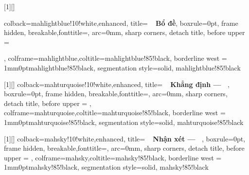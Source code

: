 [1][]{
            colback=mahlightblue!10!white,enhanced,
            title={\textbf{\faBook \ \ Bổ đề}},
            boxrule=0pt,
	    frame hidden,
            breakable,fonttitle=\sffamily,
            arc=0mm,
            sharp corners,
            detach title,
            before upper = \tcbtitle\par\smallskip,
            colframe=mahlightblue,coltitle=mahlightblue!85!black,
            borderline west = {1mm}{0pt}{mahlightblue!85!black},
            segmentation style={solid, mahlightblue!85!black}
}

[1][]{
            colback=mahturquoise!10!white,enhanced,
            title={\textbf{\faExclamation \ \ Khẳng định --- \ }},
            boxrule=0pt,
	    frame hidden,
            breakable,fonttitle=\sffamily,
            arc=0mm,
            sharp corners,
            detach title,
            before upper = \tcbtitle,
            colframe=mahturquoise,coltitle=mahturquoise!85!black,
            borderline west = {1mm}{0pt}{mahturquoise!85!black},
            segmentation style={solid, mahturquoise!85!black}
}

[1][]{
            colback=mahsky!10!white,enhanced,
            title={\textbf{\faExclamation \ \ Nhận xét --- \ }},
            boxrule=0pt,
	    frame hidden,
            breakable,fonttitle=\sffamily,
            arc=0mm,
            sharp corners,
            detach title,
            before upper = \tcbtitle,
            colframe=mahsky,coltitle=mahsky!85!black,
            borderline west = {1mm}{0pt}{mahsky!85!black},
            segmentation style={solid, mahsky!85!black}
}

\newenvironment{solution}[1][Lời giải]{%
  \proof[\faPenNib \hspace{0.2cm} \ttfamily \scshape \large #1]%
}{\(\hfill \blacksquare\){\parfillskip0pt\par}}

\newtheorem{exercise}{Bài}




\fancyhead[RO]{\footnotesize \thepage}
\fancyhead[LE]{\footnotesize \thepage}
\fancyhead[LO]{\footnotesize \leftmark}
\fancyfoot{}


